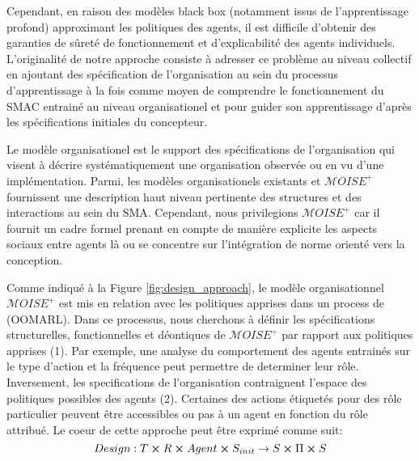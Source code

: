 \documentclass[conference]{IEEEtran}
\begin{document}
Cependant, en raison des modèles black box (notamment issus de l'apprentissage profond) approximant les politiques des agents, il est difficile d'obtenir des garanties de sûreté de fonctionnement et d'explicabilité des agents individuels\cite{jyoti2022robustness}. L'originalité de notre approche consiste à adresser ce problème au niveau collectif en ajoutant des spécification de l'organisation au sein du processus d'apprentissage à la fois comme moyen de comprendre le fonctionnement du SMAC entrainé au niveau organisationel et pour guider son apprentissage d'après les spécifications initiales du concepteur.

Le modèle organisationel est le support des spécifications de l'organisation qui visent à décrire systématiquement une organisation observée ou en vu d'une implémentation. Parmi, les modèles organisationels existants \cite{Ferber2004} et $\mathcal{M}OISE^+$\cite{Hubner2002} fournissent une description haut niveau pertinente des structures et des interactions au sein du SMA. Cependant, nous privilegions $\mathcal{M}OISE^+$ car il fournit un cadre formel prenant en compte de manière explicite les aspects sociaux entre agents là ou  se concentre sur l'intégration de norme orienté vers la conception.

Comme indiqué à la Figure \ref{fig:design_approach}, le modèle organisationnel $\mathcal{M}OISE^{+}$ est mis en relation avec les politiques apprises dans un process de  (OOMARL). Dans ce processus, nous cherchons à définir les spécifications structurelles, fonctionnelles et déontiques de $\mathcal{M}OISE^{+}$ par rapport aux politiques apprises (1). Par exemple, une analyse du comportement des agents entrainés sur le type d'action et la fréquence peut permettre de determiner leur rôle. Inversement, les specifications de l'organisation contraignent l'espace des politiques possibles des agents (2). Certaines des actions étiquetés pour des rôle particulier peuvent être accessibles ou pas à un agent en fonction du rôle attribué.
Le coeur de cette approche peut être exprimé comme suit:
\begin{equation} %
    Design: T \cross R \cross Agent \cross S_{init} \rightarrow S \cross \Pi \cross S
\end{equation}

\end{document}
